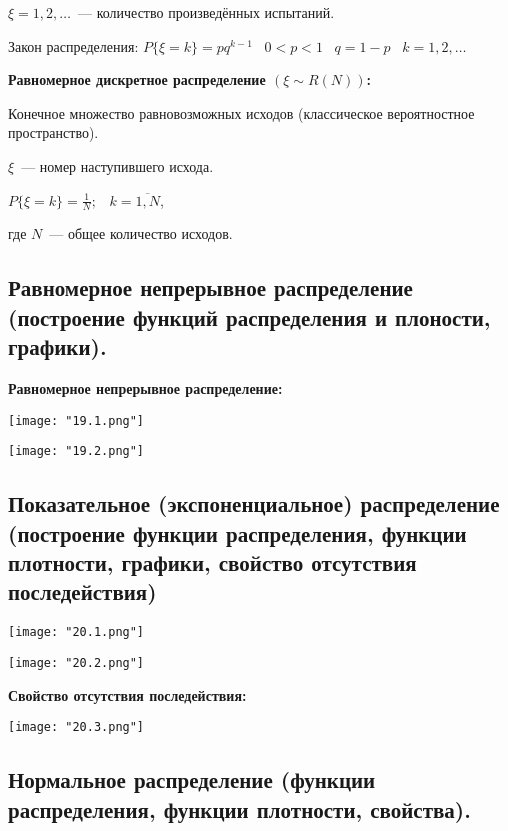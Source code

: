     $\xi = 1, 2, \dots$~--- количество произведённых испытаний.
    \smallskip

    Закон распределения: $P\{\xi = k\} = p q^{k - 1} \;\;\; 0 < p < 1 \;\;\;
    q = 1 - p \;\;\; k = 1, 2, \dots$
    \bigskip

\textbf{Равномерное дискретное распределение $(\xi \sim R(N))$:}
    \smallskip
    
    Конечное множество равновозможных исходов (классическое вероятностное
    пространство).
    \smallskip

    $\xi$~--- номер наступившего исхода.
    \smallskip

    $P\{\xi = k\} = \frac{1}{N}; \;\;\; k = \overline{1, N}$,

    где $N$~--- общее количество исходов.

\subsection{Равномерное непрерывное распределение (построение функций 
распределения и плоности, графики).}

\textbf{Равномерное непрерывное распределение:}
    \smallskip

    \begin{center}
        \texttt{[image: "19.1.png"]}
        \bigskip

        \texttt{[image: "19.2.png"]}
        \bigskip
    \end{center}
\subsection{Показательное (экспоненциальное) распределение (построение функции
распределения, функции плотности, графики, свойство отсутствия последействия)}

\begin{center}
    \texttt{[image: "20.1.png"]}
    \bigskip

    \texttt{[image: "20.2.png"]}
    \bigskip
\end{center}

\textbf{Свойство отсутствия последействия:}
    \smallskip 

    \begin{center}
        \texttt{[image: "20.3.png"]}
    \end{center}

\subsection{Нормальное распределение (функции распределения, функции плотности,
свойства).}

